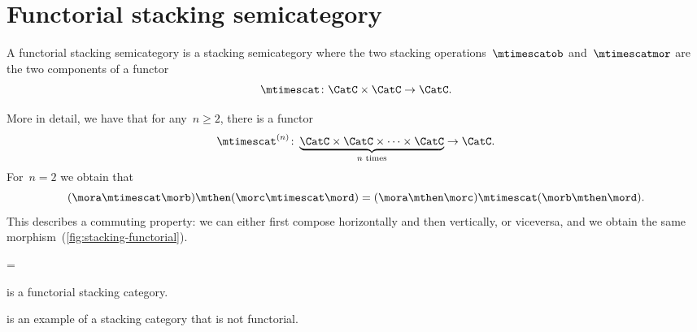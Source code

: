 \section{Functorial stacking semicategory}

\begin{ctdefinition}
    \label{def:functorial-stacking-semi-cat}
    A functorial stacking semicategory is a stacking semicategory where the two stacking operations~$\mtimescatob$ and~$\mtimescatmor$ are the two components of a functor
    \begin{equation}
        \mtimescat\colon \CatC \times \CatC \to \CatC.
    \end{equation}
\end{ctdefinition}

More in detail, we have that for any~$n \geq 2$, there is a functor
%
\begin{equation}
    \mtimescat^{(n)}\colon \underbrace {\CatC \times \CatC \times \cdots \times \CatC}_{\text{$n$ times}} \to \CatC.
\end{equation}
%
For~$n=2$ we obtain that
%
\begin{equation}
    (\mora \mtimescat \morb )
    \mthen (\morc \mtimescat \mord )
    =
    (\mora \mthen \morc ) \mtimescat (\morb \mthen \mord ).
\end{equation}
%
This describes a commuting property: we can either first compose horizontally and then vertically, or viceversa, and we obtain the same morphism~(\cref{fig:stacking-functorial}).

\begin{figure*}[h]
    \centering
    =
    \caption{Commutation of stacking and composition in a functorial stacking semicategory. }
    \label{fig:stacking-functorial}
\end{figure*}

\begin{lemma}
    \SetL is a functorial stacking category.
\end{lemma}

\Effects is an example of a stacking category that is not functorial.

